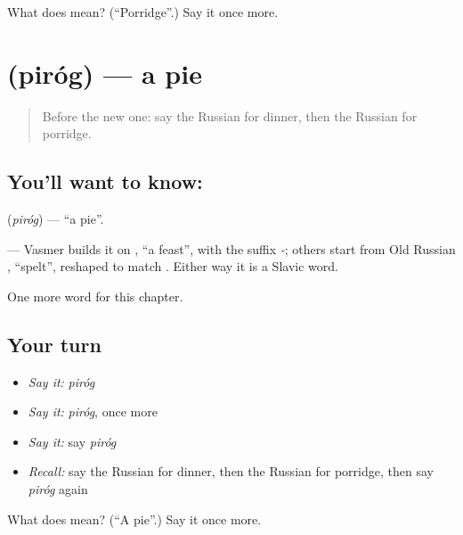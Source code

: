 \begin{tcolorbox}[breakable,colback=teal!4,colframe=teal!35!black,title={Before you move on}]
What does  mean? (\textquotedblleft{}Porridge\textquotedblright{}.) Say it once more.
\end{tcolorbox}
\section[\texorpdfstring{\ru{пирог} (piróg)}{пирог (piróg)}]{ (piróg) — a pie}

\label{lesson:RU-C46-pie}



\begin{quote}
Before the new one: say the Russian for dinner, then the Russian for porridge.
\end{quote}

\subsection*{You'll want to know: }
\textbf{} (\emph{piróg}) — \textquotedblleft{}a pie\textquotedblright{}.

\begin{cousinweb}
\textbf{} — Vasmer builds it on \emph{}, \textquotedblleft{}a feast\textquotedblright{}, with the suffix \emph{-}; others start from Old Russian \emph{}, \textquotedblleft{}spelt\textquotedblright{}, reshaped to match \emph{}. Either way it is a Slavic word.
\end{cousinweb}

\begin{grammarlens}[title={What you've built}]
One more word for this chapter.
\end{grammarlens}

\subsection*{Your turn}
\begin{itemize}
\raggedright
  \item \emph{Say it:} \emph{piróg}
  \item \emph{Say it:} \emph{piróg}, once more
  \item \emph{Say it:} say \emph{piróg}
  \item \emph{Recall:} say the Russian for dinner, then the Russian for porridge, then say \emph{piróg} again
\end{itemize}

\begin{tcolorbox}[breakable,colback=teal!4,colframe=teal!35!black,title={Before you move on}]
What does  mean? (\textquotedblleft{}A pie\textquotedblright{}.) Say it once more.
\end{tcolorbox}
